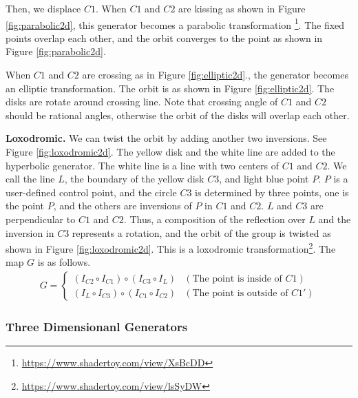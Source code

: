  Then, we displace $C1$.
 When $C1$ and $C2$ are kissing as shown in Figure 
 \ref{fig:parabolic2d},
 this generator becomes a parabolic transformation
 \footnote{\url{https://www.shadertoy.com/view/XsBcDD}}.
 The fixed points overlap each other, and the orbit converges to the
 point as shown in Figure \ref{fig:parabolic2d}.

 When $C1$ and $C2$ are crossing as in Figure \ref{fig:elliptic2d}.,
 the generator becomes an elliptic transformation.
 The orbit is as shown in Figure \ref{fig:elliptic2d}.
 The disks are rotate around crossing line.
 Note that crossing angle of $C1$ and $C2$ should be rational angles,
 otherwise the orbit of the disks will overlap each other.

\noindent\textbf{Loxodromic.}
 We can twist the orbit by adding another two inversions.
 See Figure \ref{fig:loxodromic2d}.
 The yellow disk and the white line are added to the hyperbolic generator.
 The white line is a line with two centers of $C1$ and $C2$.
 We call the line $L$, the boundary of the yellow disk $C3$, and
 light blue point $P$.
 $P$ is a user-defined control point, and the circle $C3$ is determined
 by three points, one is the point $P$, and the others are inversions
 of $P$ in $C1$ and $C2$.
 $L$ and $C3$ are perpendicular to $C1$ and $C2$.
 Thus, a composition of the reflection over $L$ and the inversion in $C3$
 represents a rotation, and
 the orbit of the group is twisted as shown in Figure
 \ref{fig:loxodromic2d}. This is a loxodromic
 transformation\footnote{\url{https://www.shadertoy.com/view/lsSyDW}}.
 The map $G$ is as follows.
 \begin{align*}
  G =
  \begin{cases}
   (I_{C2} \circ I_{C1}) \circ (I_{C3} \circ I_L) & (\text{The point is inside of } C1) \\
   (I_L \circ I_{C3}) \circ (I_{C1} \circ I_{C2}) & (\text{The point is outside of }C1')
  \end{cases}
 \end{align*}

\subsubsection{Three Dimensionanl Generators}

